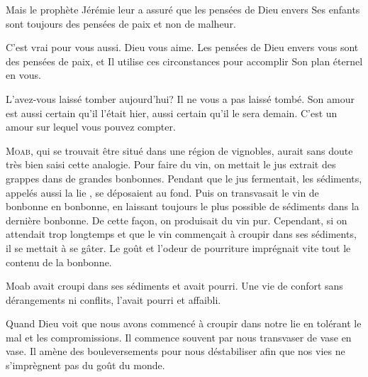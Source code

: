 Mais le prophète Jérémie leur a assuré que les pensées de Dieu envers
 Ses enfants sont toujours des pensées de paix et non de malheur. 

C'est vrai pour vous aussi. Dieu vous aime.
 Les pensées de Dieu envers vous sont des pensées de paix,
 et Il utilise ces circonstances pour accomplir Son plan éternel en vous. 

L'avez-vous laissé tomber aujourd'hui? Il ne vous a pas laissé tombé.
 Son amour est aussi certain qu'il l'était hier,
 aussi certain qu'il le sera demain.
 C'est un amour sur lequel vous pouvez compter. 

\dvrule







\lettrine{M}{oab,} qui se trouvait être situé
 dans une région de vignobles, aurait sans doute très bien saisi
 cette analogie. Pour faire du vin, on mettait le jus extrait des grappes
 dans de grandes bonbonnes. Pendant que le jus fermentait, les sédiments,
 appelés aussi \og la lie \fg{}, se déposaient au fond.
 Puis on transvasait le vin de bonbonne en bonbonne, en laissant toujours
 le plus possible de sédiments dans la dernière bonbonne.
 De cette façon, on produisait du vin pur.
 Cependant, si on attendait trop longtemps et que le vin commençait à croupir
 dans ses sédiments, il se mettait à se gâter.
 Le goût et l'odeur de pourriture imprégnait vite tout le contenu
 de la bonbonne. 

Moab avait croupi dans ses sédiments et avait pourri.
 Une vie de confort sans dérangements ni conflits, l'avait pourri et affaibli. 

Quand Dieu voit que nous avons commencé à croupir dans notre lie
 en tolérant le mal et les compromissions.
 Il commence souvent par nous transvaser de vase en vase.
 Il amène des bouleversements pour nous déstabiliser afin que nos vies
 ne s'imprègnent pas du goût du monde. 


